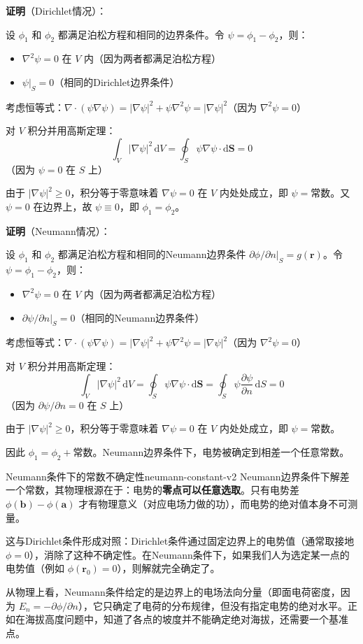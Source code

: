 \documentclass[11pt,a4paper,openany,oneside]{book}
\newcommand{\diff}{\mathrm{d}}
\newcommand{\vect}[1]{\bm{#1}}
\newcommand{\grad}{\nabla}
\newcommand{\divg}{\nabla\cdot}
\newcommand{\lap}{\nabla^2}
\begin{document}
\textbf{证明}（Dirichlet情况）：

设 $\phi_1$ 和 $\phi_2$ 都满足泊松方程和相同的边界条件。令 $\psi = \phi_1 - \phi_2$，则：
\begin{itemize}
\item $\lap\psi = 0$ 在 $V$ 内（因为两者都满足泊松方程）
\item $\psi|_S = 0$（相同的Dirichlet边界条件）
\end{itemize}

考虑恒等式：$\divg(\psi\grad\psi) = |\grad\psi|^2 + \psi\lap\psi = |\grad\psi|^2$（因为 $\lap\psi = 0$）

对 $V$ 积分并用高斯定理：
\[
\int_V |\grad\psi|^2 \, \diff V = \oint_S \psi\grad\psi \cdot \diff\vect{S} = 0
\]
（因为 $\psi = 0$ 在 $S$ 上）

由于 $|\grad\psi|^2 \geq 0$，积分等于零意味着 $\grad\psi = 0$ 在 $V$ 内处处成立，即 $\psi = \text{常数}$。又 $\psi = 0$ 在边界上，故 $\psi \equiv 0$，即 $\phi_1 = \phi_2$。

\textbf{证明}（Neumann情况）：

设 $\phi_1$ 和 $\phi_2$ 都满足泊松方程和相同的Neumann边界条件 $\partial\phi/\partial n|_S = g(\vect{r})$。令 $\psi = \phi_1 - \phi_2$，则：
\begin{itemize}
\item $\lap\psi = 0$ 在 $V$ 内（因为两者都满足泊松方程）
\item $\partial\psi/\partial n|_S = 0$（相同的Neumann边界条件）
\end{itemize}

考虑恒等式：$\divg(\psi\grad\psi) = |\grad\psi|^2 + \psi\lap\psi = |\grad\psi|^2$（因为 $\lap\psi = 0$）

对 $V$ 积分并用高斯定理：
\[
\int_V |\grad\psi|^2 \, \diff V = \oint_S \psi\grad\psi \cdot \diff\vect{S}
= \oint_S \psi \frac{\partial\psi}{\partial n} \, \diff S = 0
\]
（因为 $\partial\psi/\partial n = 0$ 在 $S$ 上）

由于 $|\grad\psi|^2 \geq 0$，积分等于零意味着 $\grad\psi = 0$ 在 $V$ 内处处成立，即 $\psi = \text{常数}$。

因此 $\phi_1 = \phi_2 + \text{常数}$。Neumann边界条件下，电势被确定到相差一个任意常数。

\begin{insight}{Neumann条件下的常数不确定性}{neumann-constant-v2}
Neumann边界条件下解差一个常数，其物理根源在于：电势的\textbf{零点可以任意选取}。只有电势差 $\phi(\vect{b}) - \phi(\vect{a})$ 才有物理意义（对应电场力做的功），而电势的绝对值本身不可测量。

这与Dirichlet条件形成对照：Dirichlet条件通过固定边界上的电势值（通常取接地 $\phi=0$），消除了这种不确定性。在Neumann条件下，如果我们人为选定某一点的电势值（例如 $\phi(\vect{r}_0) = 0$），则解就完全确定了。

从物理上看，Neumann条件给定的是边界上的电场法向分量（即面电荷密度，因为 $E_n = -\partial\phi/\partial n$），它只确定了电荷的分布规律，但没有指定电势的绝对水平。正如在海拔高度问题中，知道了各点的坡度并不能确定绝对海拔，还需要一个基准点。
\end{insight}
\end{document}
